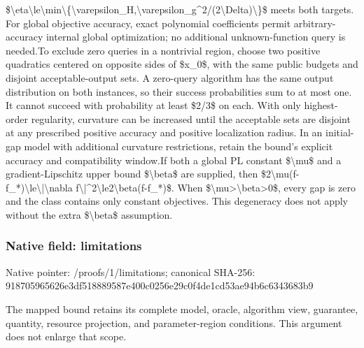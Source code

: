 \documentclass[10pt,a4paper]{article}
\begin{document}
\$\textbackslash{}eta\textbackslash{}le\textbackslash{}min\textbackslash{}\{\textbackslash{}varepsilon\_\allowbreak{}H,\allowbreak{}\textbackslash{}varepsilon\_\allowbreak{}g\textasciicircum{}2/\allowbreak{}(2\textbackslash{}Delta)\textbackslash{}\}\$ meets both targets. For global objective accuracy,\allowbreak{} exact polynomial coefficients permit arbitrary-accuracy internal global optimization;\allowbreak{} no additional unknown-function query is needed.\newline{}\newline{}To exclude zero queries in a nontrivial region,\allowbreak{} choose two positive quadratics centered on opposite sides of \$x\_\allowbreak{}0\$,\allowbreak{} with the same public budgets and disjoint acceptable-output sets. A zero-query algorithm has the same output distribution on both instances,\allowbreak{} so their success probabilities sum to at most one. It cannot succeed with probability at least \$2/\allowbreak{}3\$ on each. With only highest-order regularity,\allowbreak{} curvature can be increased until the acceptable sets are disjoint at any prescribed positive accuracy and positive localization radius. In an initial-gap model with additional curvature restrictions,\allowbreak{} retain the bound's explicit accuracy and compatibility window.\newline{}\newline{}If both a global PL constant \$\textbackslash{}mu\$ and a gradient-Lipschitz upper bound \$\textbackslash{}beta\$ are supplied,\allowbreak{} then \$2\textbackslash{}mu(f-f\_\allowbreak{}*)\textbackslash{}le\textbackslash{}|\textbackslash{}nabla f\textbackslash{}|\textasciicircum{}2\textbackslash{}le2\textbackslash{}beta(f-f\_\allowbreak{}*)\$. When \$\textbackslash{}mu>\textbackslash{}beta>0\$,\allowbreak{} every gap is zero and the class contains only constant objectives. This degeneracy does not apply without the extra \$\textbackslash{}beta\$ assumption.\par\endgroup

\subsubsection{Native field: limitations}
Native pointer: /proofs/1/limitations; canonical SHA-256: 918705965626e3df518889587e400c0256e29c0f4de1cd53ae94b6c6343683b9

\begingroup\raggedright\sloppy The mapped bound retains its complete model,\allowbreak{} oracle,\allowbreak{} algorithm view,\allowbreak{} guarantee,\allowbreak{} quantity,\allowbreak{} resource projection,\allowbreak{} and parameter-region conditions. This argument does not enlarge that scope.\par\endgroup
\end{document}

